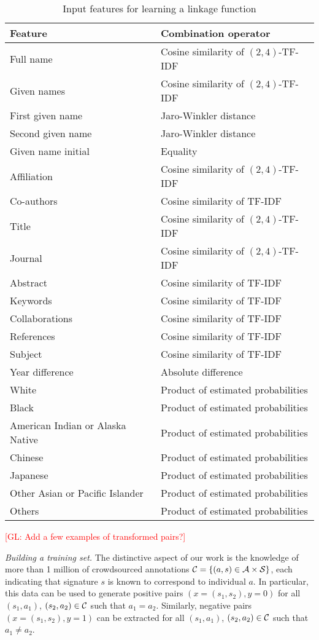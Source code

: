 \documentclass{article}
\newcommand{\glnote}[1]{\textcolor{red}{[GL: #1]}}
\begin{document}
\begin{table}
\caption{Input features for learning a linkage function}
\label{table:features}
\centering
\begin{tabular}{|l|l|}
  \hline
  \textbf{Feature} & \textbf{Combination operator}\\
  \hline
  \hline
  Full name & Cosine similarity of $(2,4)$-TF-IDF\\
  Given names & Cosine similarity of $(2,4)$-TF-IDF\\
  First given name & Jaro-Winkler distance\\
  Second given name & Jaro-Winkler distance\\
  Given name initial & Equality\\
  Affiliation & Cosine similarity of $(2,4)$-TF-IDF\\
  Co-authors & Cosine similarity of TF-IDF\\
  Title & Cosine similarity of $(2,4)$-TF-IDF\\
  Journal & Cosine similarity of $(2,4)$-TF-IDF\\
  Abstract & Cosine similarity of TF-IDF\\
  Keywords & Cosine similarity of TF-IDF\\
  Collaborations & Cosine similarity of TF-IDF\\
  References & Cosine similarity of TF-IDF\\
  Subject & Cosine similarity of TF-IDF\\
  Year difference & Absolute difference\\
  \hline
  White & Product of estimated probabilities\\
  Black & Product of estimated probabilities\\
  American Indian or Alaska Native & Product of estimated probabilities\\
  Chinese & Product of estimated probabilities\\
  Japanese & Product of estimated probabilities\\
  Other Asian or Pacific Islander & Product of estimated probabilities\\
  Others & Product of estimated probabilities\\
  \hline
\end{tabular}
\end{table}

\glnote{Add a few examples of transformed pairs?}

\textit{Building a training set.} The distinctive aspect of our work is the
knowledge of more than 1 million of crowdsourced annotations ${\cal C} = \{(a,
s) \in {\cal A} \times {\cal S}\}$, each indicating that signature $s$ is known
to correspond to individual $a$. In particular, this data can be used to
generate positive pairs $(x=(s_1, s_2), y=0)$ for all $(s_1, a_1)$, $(s_2, a_2)
\in {\cal C}$ such that $a_1=a_2$. Similarly, negative pairs $(x=(s_1, s_2), y=1)$
can be extracted for all $(s_1, a_1)$, $(s_2, a_2)
\in {\cal C}$ such that $a_1 \neq a_2$.
\end{document}

